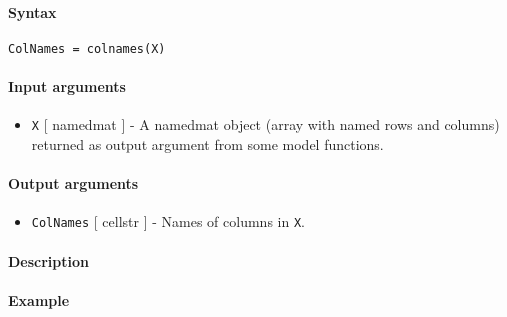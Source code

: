 


	\paragraph{Syntax}\label{syntax}

\begin{verbatim}
ColNames = colnames(X)
\end{verbatim}

\paragraph{Input arguments}\label{input-arguments}

\begin{itemize}
\itemsep1pt\parskip0pt
\item
  \texttt{X} {[} namedmat {]} - A namedmat object (array with named rows
  and columns) returned as output argument from some model functions.
\end{itemize}

\paragraph{Output arguments}\label{output-arguments}

\begin{itemize}
\itemsep1pt\parskip0pt
\item
  \texttt{ColNames} {[} cellstr {]} - Names of columns in \texttt{X}.
\end{itemize}

\paragraph{Description}\label{description}

\paragraph{Example}\label{example}


